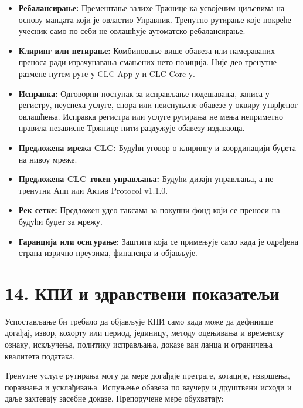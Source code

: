 \documentclass[11pt]{article}
\begin{document}
\begin{itemize}[leftmargin=*]
\item \textbf{Ребалансирање:} Премештање залихе Тржнице ка усвојеним циљевима на основу мандата који је овластио Управник. Тренутно рутирање које покреће учесник само по себи не овлашћује аутоматско ребалансирање.
\item \textbf{Клиринг или нетирање:} Комбиновање више обавеза или намераваних преноса ради израчунавања смањених нето позиција. Није део тренутне размене путем руте у CLC App-у и CLC Core-у.
\item \textbf{Исправка:} Одговорни поступак за исправљање подешавања, записа у регистру, неуспеха услуге, спора или неиспуњене обавезе у оквиру утврђеног овлашћења. Исправка регистра или услуге рутирања не мења неприметно правила независне Тржнице нити раздужује обавезу издаваоца.
\item \textbf{Предложена мрежа CLC:} Будући уговор о клирингу и координацији буџета на нивоу мреже.
\item \textbf{Предложена CLC токен управљања:} Будући дизајн управљања, а не тренутни Апп или Актив Protocol v1.1.0.
\item \textbf{Рек сетке:} Предложен удео таксама за покупни фонд који се преноси на будући буџет за мрежу.
\item \textbf{Гаранција или осигурање:} Заштита која се примењује само када је одређена страна изрично преузима, финансира и објављује.
\end{itemize}

\section*{14. КПИ и здравствени показатељи}

Успостављање би требало да објављује КПИ само када може да дефинише догађај, извор, кохорту или период, јединицу, методу оцењивања и временску ознаку, искључења, политику исправљања, доказе ван ланца и ограничења квалитета података.

Тренутне услуге рутирања могу да мере догађаје претраге, котације, извршења, поравнања и усклађивања. Испуњење обавеза по ваучеру и друштвени исходи и даље захтевају засебне доказе. Препоручене мере обухватају:
\end{document}
